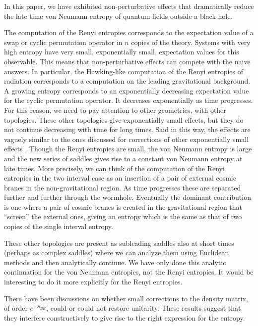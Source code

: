 
In this paper, we have exhibited non-perturbative effects that dramatically reduce the late time von Neumann entropy of quantum fields outside a black hole.

The computation of the Renyi entropies corresponds to the expectation value of a swap or cyclic permutation operator in $n$ copies of the theory. Systems with very high entropy have very small, exponentially small,  expectation values for this observable. This means that non-perturbative effects can compete with the naive answers. In particular, the Hawking-like computation of the Renyi entropies of radiation corresponds to a computation on the leading gravitational background. A growing entropy corresponds to an exponentially decreasing expectation value for the cyclic permutation operator. It decreases exponentially as time progresses. 
 For this reason, we need to pay attention to other geometries, with other topologies. These other topologies give exponentially small effects, but they do not continue decreasing with time for long times. 
 Said in this way, the effects are vaguely similar to the ones discussed for corrections of other exponentially small effects 
 \cite{Maldacena:2001kr,Saad:2018bqo,Saad:2019lba,Saad:2019pqd}. 
 Though the Renyi entropies are small,  the von Neumann entropy is large and  the new series of saddles gives rise to a constant von Neumann  
 entropy at late times.  More precisely, we can think of the computation of the Renyi entropies in the two interval case as an insertion of a pair of external cosmic branes in the non-gravitational region. As time progresses these are separated further and further through the wormhole. Eventually the dominant contribution is one where a pair of cosmic branes is created in the gravitational region that ``screen'' the external ones, giving an entropy which is the same as that of two copies of the single interval entropy. 
 
   These other topologies are present as subleading saddles also at short times (perhaps as complex saddles) where we can analyze them using Euclidean methods and then analytically continue. We have only done this analytic continuation for the von Neumann entropies, not the Renyi entropies. It would be interesting to do it more explicitly for the Renyi entropies.
  
  There have been discussions on whether small corrections to the density matrix, of order $e^{ -S_{BH}}$,
 could or could not restore unitarity. These results suggest that they interfere constructively to give rise 
 to the right expression for the entropy. 
  
